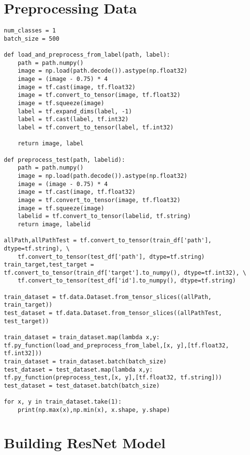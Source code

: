 \section{Preprocessing Data}

\begin{verbatim}
num_classes = 1
batch_size = 500

def load_and_preprocess_from_label(path, label):
    path = path.numpy()
    image = np.load(path.decode()).astype(np.float32)
    image = (image - 0.75) * 4
    image = tf.cast(image, tf.float32)
    image = tf.convert_to_tensor(image, tf.float32)
    image = tf.squeeze(image)
    label = tf.expand_dims(label, -1)
    label = tf.cast(label, tf.int32)
    label = tf.convert_to_tensor(label, tf.int32)

    return image, label

def preprocess_test(path, labelid):
    path = path.numpy()
    image = np.load(path.decode()).astype(np.float32)
    image = (image - 0.75) * 4
    image = tf.cast(image, tf.float32)
    image = tf.convert_to_tensor(image, tf.float32)
    image = tf.squeeze(image)
    labelid = tf.convert_to_tensor(labelid, tf.string)
    return image, labelid

allPath,allPathTest = tf.convert_to_tensor(train_df['path'], dtype=tf.string), \
    tf.convert_to_tensor(test_df['path'], dtype=tf.string)
train_target,test_target = tf.convert_to_tensor(train_df['target'].to_numpy(), dtype=tf.int32), \
    tf.convert_to_tensor(test_df['id'].to_numpy(), dtype=tf.string)

train_dataset = tf.data.Dataset.from_tensor_slices((allPath, train_target))
test_dataset = tf.data.Dataset.from_tensor_slices((allPathTest, test_target))

train_dataset = train_dataset.map(lambda x,y: tf.py_function(load_and_preprocess_from_label,[x, y],[tf.float32, tf.int32]))
train_dataset = train_dataset.batch(batch_size)
test_dataset = test_dataset.map(lambda x,y: tf.py_function(preprocess_test,[x, y],[tf.float32, tf.string]))
test_dataset = test_dataset.batch(batch_size)

for x, y in train_dataset.take(1):
    print(np.max(x),np.min(x), x.shape, y.shape)
\end{verbatim}



\section{Building ResNet Model}




